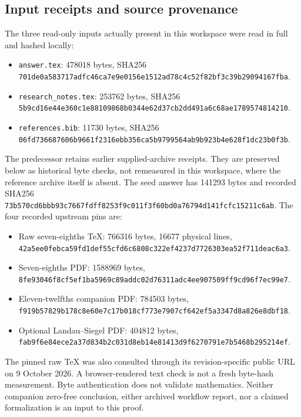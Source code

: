 \documentclass[12pt]{article}
\begin{document}
\subsection{Input receipts and source provenance}
The three read-only inputs actually present in this workspace were
read in full and hashed locally:
\begin{itemize}
\item \texttt{answer.tex}: 478018 bytes, SHA256
\nolinkurl{701de0a583717adfc46ca7e9e0156e1512ad78c4c52f82bf3c39b29094167fba}.
\item \texttt{research\_notes.tex}: 253762 bytes, SHA256
\nolinkurl{5b9cd16e44e360c1e88109868b0344e62d37cb2dd491a6c68ae1789574814210}.
\item \texttt{references.bib}: 11730 bytes, SHA256
\nolinkurl{06fd736687606b9661f2316ebb356ca5b9799564ab9b923b4e628f1dc23b0f3b}.
\end{itemize}
The predecessor retains earlier supplied-archive receipts.  They are
preserved below as historical byte checks, not remeasured in this
workspace, where the reference archive itself is absent.
The seed answer has 141293 bytes and recorded SHA256
\nolinkurl{73b570cd6bbb93c7667fdff8253f9c011f3f60bd0a76794d141fcfc15211c6ab}.
The four recorded upstream pins are:
\begin{itemize}
\item Raw seven-eighths TeX: 766316 bytes, 16677 physical lines,
\nolinkurl{42a5ee0febca59fd1def55cfd6c6808c322ef4237d7726303ea52f711deac6a3}.
\item Seven-eighths PDF: 1588969 bytes,
\nolinkurl{8fe93046f8cf5ef1ba5969c89addc02d76311adc4ee907509ff9cd96f7ec99e7}.
\item Eleven-twelfths companion PDF: 784503 bytes,
\nolinkurl{f919b57829b178c8e60e7c17b018cf773e7907cf642ef5a3347d8a826e8dbf18}.
\item Optional Landau--Siegel PDF: 404812 bytes,
\nolinkurl{fab9f6e84ece2a37d834b2c031d8eb14e81413d9f6270791e7b5468b295214ef}.
\end{itemize}
The pinned raw TeX was also consulted through its revision-specific
public URL on 9 October 2026.  A browser-rendered text check is not
a fresh byte-hash measurement.  Byte authentication does not validate
mathematics.  Neither companion zero-free conclusion, either archived
workflow report, nor a claimed formalization is an input to this proof.
\end{document}
